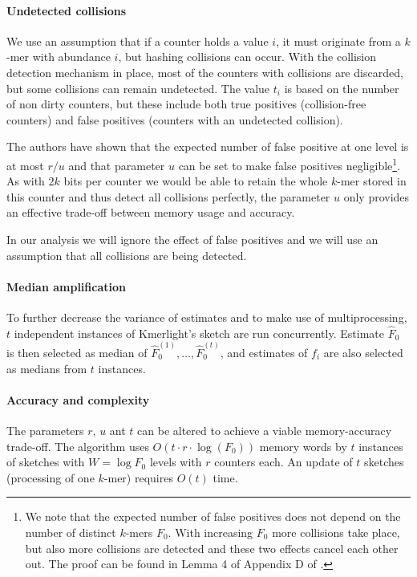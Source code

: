 \paragraph{Undetected collisions}
We use an assumption that if a counter holds a value $i$, it must originate from a $k$-mer 
with abundance $i$, but hashing collisions can occur. With the collision detection mechanism
in place, most of the counters with collisions are discarded, but some collisions can remain
undetected. The value $t_i$ is based on the number of non dirty counters, but these include both
true positives (collision-free counters) and false positives (counters with an undetected
collision). 

The authors have shown that the expected number of false positive at one level
is at most $r/u$ and that parameter $u$ can be set to make false positives negligible\footnote{We 
note that the expected number of false positives does not depend on
the number of distinct $k$-mers $F_0$. With increasing $F_0$ more collisions take place,
but also more collisions are detected and these two effects cancel each other out. 
The proof can be found in Lemma 4 of Appendix D of \cite{Sivadasan2016}.}. As with $2k$ 
bits per counter we would be able to retain the whole $k$-mer stored in this 
counter and thus detect all collisions perfectly, the parameter $u$ only provides 
an effective trade-off between memory usage and accuracy.

In our analysis we will ignore the effect of false positives and we will use an assumption
that all collisions are being detected.

\paragraph{Median amplification}
To further decrease the variance of estimates and to make use of multiprocessing, 
$t$ independent instances of Kmerlight's sketch are run concurrently.
Estimate $\hat F_0$ is then selected as median of $\hat F_0^{(1)}, \dots, \hat F_0^{(t)}$, 
and estimates of $f_i$ are also selected as medians from $t$ instances. 

\paragraph{Accuracy and complexity}
The parameters $r$, $u$ ant $t$ can be altered to achieve a viable memory-accuracy trade-off.
The algorithm uses $O(t \cdot r \cdot \log(F_0))$ memory words by $t$ instances of sketches
with $W = \log F_0$ levels with $r$ counters each. 
An update of $t$ sketches (processing of one $k$-mer) requires $O(t)$ time.

